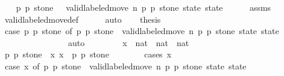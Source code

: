 \begin{isabellebody}
%
\isadelimproof
%
\endisadelimproof
%
\isatagproof
{}\isamarkupfalse%
{\isacharminus}\isanewline
\ \ \isamarkupfalse%
\ p{}\ p{}\ stone\ \ {\isacharasterisk}{\isacharcolon}\ {\isachardoublequoteopen}valid{\isacharunderscore}labeled{\isacharunderscore}move{\isacharprime}\ n\ p{}\ p{}\ stone\ state\ state{\isacharprime}{\isachardoublequoteclose}\isanewline
\ \ \ \ \isamarkupfalse%
\ assms\isanewline
\ \ \ \ \isamarkupfalse%
\ valid{\isacharunderscore}labeled{\isacharunderscore}move{\isacharunderscore}def\isanewline
\ \ \ \ \isamarkupfalse%
\ auto\isanewline
\ \ \isamarkupfalse%
\ {\isacharquery}thesis\isanewline
\ \ \isamarkupfalse%
\isanewline
\ \ \ \ \isamarkupfalse%
\ {\isachardoublequoteopen}case\ {\isacharparenleft}p{}{\isacharcomma}\ p{}{\isacharcomma}\ stone{\isacharparenright}\ of\ {\isacharparenleft}p{}{\isacharcomma}\ p{}{\isacharcomma}\ stone{\isacharparenright}\ {\isasymRightarrow}\ valid{\isacharunderscore}labeled{\isacharunderscore}move{\isacharprime}\ n\ p{}\ p{}\ stone\ state\ state{\isacharprime}{\isachardoublequoteclose}\isanewline
\ \ \ \ \ \ \isamarkupfalse%
\ {\isacharasterisk}\isanewline
\ \ \ \ \ \ \isamarkupfalse%
\ auto\isanewline
\ \ \isamarkupfalse%
\isanewline
\ \ \ \ \isamarkupfalse%
\ x\ {\isacharcolon}{\isacharcolon}\ {\isachardoublequoteopen}nat\ {\isasymtimes}\ nat\ {\isasymtimes}\ nat{\isachardoublequoteclose}\isanewline
\ \ \ \ \isamarkupfalse%
\ p{}{\isacharprime}\ p{}{\isacharprime}\ stone{\isacharprime}\ \ x{\isacharcolon}\ {\isachardoublequoteopen}x\ {\isacharequal}\ {\isacharparenleft}p{}{\isacharprime}{\isacharcomma}\ p{}{\isacharprime}{\isacharcomma}\ stone{\isacharprime}{\isacharparenright}{\isachardoublequoteclose}\isanewline
\ \ \ \ \ \ \isamarkupfalse%
\ {\isacharparenleft}cases\ x{\isacharparenright}\isanewline
\ \ \ \ \isamarkupfalse%
\ {\isachardoublequoteopen}case\ x\ of\ {\isacharparenleft}p{}{\isacharcomma}\ p{}{\isacharcomma}\ stone{\isacharparenright}\ {\isasymRightarrow}\ valid{\isacharunderscore}labeled{\isacharunderscore}move{\isacharprime}\ n\ p{}\ p{}\ stone\ state\ state{\isacharprime}{\isachardoublequoteclose}\isanewline

\end{isabellebody}
